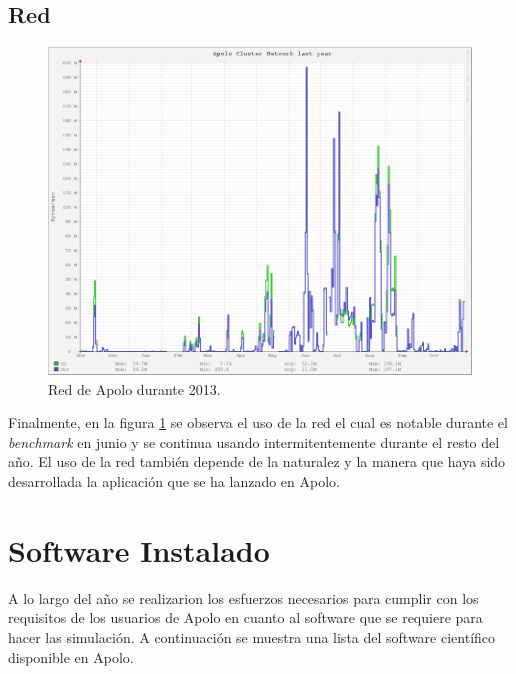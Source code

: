 \subsection{Red}
\begin{figure}[ht]
  \centering
  \includegraphics[scale=0.45]{imgs/network2013.png}
  \caption{Red de Apolo durante 2013.}
  \label{fig:net}
\end{figure}

Finalmente, en la figura \ref{fig:net} se observa el uso de la red el cual es notable durante el \textit{benchmark} en junio y se continua usando intermitentemente durante el resto del año. El uso de la red también depende de la naturalez y la manera que haya sido desarrollada la aplicación que se ha lanzado en Apolo.

\newpage
\section{Software Instalado}

A lo largo del año se realizarion los esfuerzos necesarios para cumplir con los requisitos de los usuarios de Apolo en cuanto al software que se requiere para hacer las simulación. A continuación se muestra una lista del software científico disponible en Apolo.

